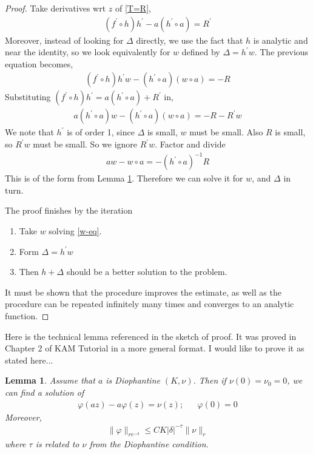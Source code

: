 \documentclass{article}
\theoremstyle{plain}
\newtheorem{lemma}{Lemma}
\theoremstyle{remark}
\begin{document}
\begin{proof}
Take derivatives wrt $z$ of \ref{T=R},
\begin{align*}
\left( f^\prime \circ h \right) h ^ \prime - a \left( h^\prime \circ a \right) = R^\prime
\end{align*}
Moreover, instead of looking for $\Delta$ directly, we use the fact that $h$ is analytic and near the identity, so we look equivalently for $w$ defined by $\Delta = h^\prime w$. 
The previous equation becomes,
\begin{align*}
\left( f^\prime \circ h \right) h^\prime w - \left( h^\prime \circ a \right)\left( w \circ a\right)  = - R
\end{align*}
Substituting $\left( f^\prime \circ h \right) h ^ \prime = a \left( h^\prime \circ a \right) + R^\prime$ in,
\begin{align*}
a \left( h^\prime \circ a \right) w - \left( h^\prime \circ a\right)\left( w \circ a\right)  = - R - R^\prime w
\end{align*}
We note that $h^\prime$ is of order 1, since $\Delta$ is small, $w$ must be small.
Also $R$ is small, so $R^\prime w$ must be small. 
So we ignore $R^\prime w$. 
Factor and divide
\begin{align}\label{w-eq}
aw - w\circ a = - \left(h^\prime\circ a\right)^{-1} R
\end{align}
This is of the form from Lemma \ref{lemma-36}. 
Therefore we can solve it for $w$, and $\Delta$ in turn.

The proof finishes by the iteration
\begin{enumerate}
\item Take $w$ solving \ref{w-eq}.
\item Form $\Delta = h^\prime w$
\item Then $h + \Delta$ should be a better solution to the problem.
\end{enumerate}
It must be shown that the procedure improves the estimate, as well as the procedure can be repeated infinitely many times and converges to an analytic function.
\end{proof}

Here is the technical lemma referenced in the sketch of proof. 
It was proved in Chapter 2 of KAM Tutorial in a more general format. 
I would like to prove it as stated here...

\begin{lemma}\label{lemma-36}
Assume that $a$ is Diophantine $(K, \nu)$. Then if $\nu(0) = \nu_0 = 0$, we can find a solution of 
\begin{align*}
\varphi(az) - a \varphi(z) = \nu(z); && \varphi(0) = 0
\end{align*}
Moreover,
\begin{align*}
\| \varphi \|_{re^{-\delta}} \leq CK | \delta |^{-\tau} \| \nu \|_r
\end{align*}
where $\tau$ is related to $\nu$ from the Diophantine condition.
\end{lemma}
\end{document}

